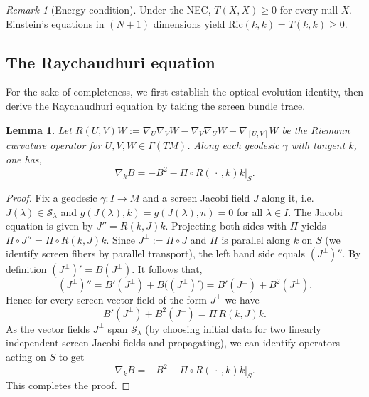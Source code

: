 \documentclass[a4paper, reqno]{amsart}
\numberwithin{equation}{section}
\theoremstyle{plain}
\newtheorem{lemma}[theorem]{Lemma}
\theoremstyle{definition}
\theoremstyle{remark}
\newtheorem{remark}[theorem]{Remark}
\newcommand{\lam}{\lambda}
\begin{document}
\begin{remark}[Energy condition]
Under the NEC, $T(X,X)\ge 0$ for every null $X$. Einstein’s equations in $(N+1)$ dimensions yield $\mathrm{Ric}(k,k)=T(k,k)\ge 0$.
\end{remark}

\subsection{The Raychaudhuri equation}\label{sec:ray}

For the sake of completeness, we first establish the optical evolution identity, then derive the Raychaudhuri equation by taking the screen bundle trace.

\begin{lemma}\label{lem:optical-evolution}
Let $R(U,V)W:=\nabla_U\nabla_VW-\nabla_V\nabla_UW-\nabla_{[U,V]}W$ be the Riemann curvature operator for $U,V,W\in\Gamma(TM)$. Along each geodesic $\gamma$ with tangent $k$, one has,
\begin{equation}\label{optical-identity}
    \nabla_k B=-B^2-\Pi\circ R(\,\cdot\,,k)k\big|_{S}.
\end{equation}
\end{lemma}
\begin{proof}
Fix a geodesic $\gamma:I\to M$ and a screen Jacobi field $J$ along it, i.e. $J(\lam)\in \mathcal S_\lam$ and $g(J(\lam),k)=g(J(\lam),n)=0$ for all $\lam\in I$. The Jacobi equation is given by $J''=R(k,J)k$. Projecting both sides with $\Pi$ yields $\Pi\circ J''=\Pi\circ R(k,J)k$. Since $J^\perp:=\Pi \circ J$ and $\Pi$ is parallel along $k$ on $S$ (we identify screen fibers by parallel transport), the left hand side equals $(J^\perp)''$. By definition \((J^\perp)'=B(J^\perp)\). It follows that,
$$(J^\perp)''=B'(J^\perp)+B\big((J^\perp)'\big)=B'(J^\perp)+B^2(J^\perp).$$
Hence for every screen vector field of the form $J^\perp$ we have
$$B'(J^\perp)+B^2(J^\perp)=\Pi\,R(k,J)k.$$
As the vector fields $J^\perp$ span $\mathcal S_\lam$ (by choosing initial data for two linearly independent screen Jacobi fields and propagating), we can identify operators acting on $S$ to get
$$\nabla_k B=-B^2-\Pi\circ R(\,\cdot\,,k)k\big|_{S}.$$
This completes the proof.

\end{proof}
\end{document}
